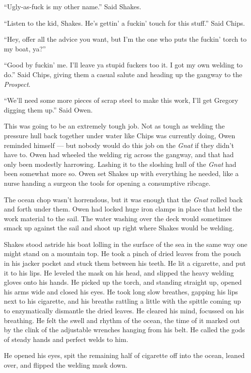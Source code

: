 \documentclass[]{scrbook}
\begin{document}
``Ugly-as-fuck is my other name.'' Said Shakes.

``Listen to the kid, Shakes. He's gettin' a fuckin' touch for this
stuff.'' Said Chips.

``Hey, offer all the advice you want, but I'm the one who puts the
fuckin' torch to my boat, ya?''

``Good by fuckin' me. I'll leave ya stupid fuckers too it. I got my own
welding to do.'' Said Chips, giving them a casual salute and heading up
the gangway to the \emph{Prospect}.

``We'll need some more pieces of scrap steel to make this work, I'll get
Gregory digging them up.'' Said Owen.

This was going to be an extremely tough job. Not as tough as welding the
pressure hull back together under water like Chips was currently doing,
Owen reminded himself --- but nobody would do this job on the
\emph{Gnat} if they didn't have to. Owen had wheeled the welding rig
across the gangway, and that had only been modestly harrowing. Lashing
it to the sloshing hull of the \emph{Gnat} had been somewhat more so.
Owen set Shakes up with everything he needed, like a nurse handing a
surgeon the tools for opening a consumptive ribcage.

The ocean chop wasn't horrendous, but it was enough that the \emph{Gnat}
rolled back and forth under them. Owen had locked huge iron clamps in
place that held the work material to the sail. The water washing over
the deck would sometimes smack up against the sail and shoot up right
where Shakes would be welding.

Shakes stood astride his boat lolling in the surface of the sea in the
same way one might stand on a mountain top. He took a pinch of dried
leaves from the pouch in his jacker pocket and stuck them between his
teeth. He lit a cigarette, and put it to his lips. He leveled the mask
on his head, and slipped the heavy welding gloves onto his hands. He
picked up the torch, and standing straight up, opened his arms wide and
closed his eyes. He took long slow breathes, gapping his lips next to
his cigarette, and his breaths rattling a little with the spittle coming
up to enzymatically dismantle the dried leaves. He cleared his mind,
focussed on his breathing. He felt the swell and rhythm of the ocean,
the time of it marked out by the clink of the adjustable wrenches
hanging from his belt. He called the gods of steady hands and perfect
welds to him.

He opened his eyes, spit the remaining half of cigarette off into the
ocean, leaned over, and flipped the welding mask down.
\end{document}
